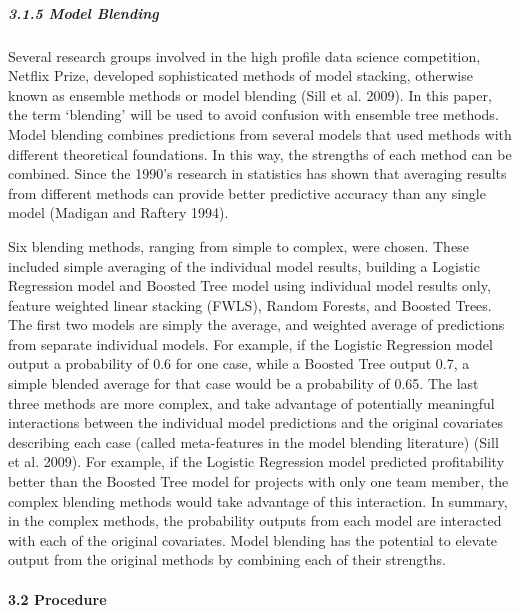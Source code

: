 \documentclass[]{elsarticle} %
\begin{document}
\subparagraph{3.1.5 Model Blending}\label{model-blending}

Several research groups involved in the high profile data science
competition, Netflix Prize, developed sophisticated methods of model
stacking, otherwise known as ensemble methods or model blending (Sill et
al. 2009). In this paper, the term `blending' will be used to avoid
confusion with ensemble tree methods. Model blending combines
predictions from several models that used methods with different
theoretical foundations. In this way, the strengths of each method can
be combined. Since the 1990's research in statistics has shown that
averaging results from different methods can provide better predictive
accuracy than any single model (Madigan and Raftery 1994).

Six blending methods, ranging from simple to complex, were chosen. These
included simple averaging of the individual model results, building a
Logistic Regression model and Boosted Tree model using individual model
results only, feature weighted linear stacking (FWLS), Random Forests,
and Boosted Trees. The first two models are simply the average, and
weighted average of predictions from separate individual models. For
example, if the Logistic Regression model output a probability of 0.6
for one case, while a Boosted Tree output 0.7, a simple blended average
for that case would be a probability of 0.65. The last three methods are
more complex, and take advantage of potentially meaningful interactions
between the individual model predictions and the original covariates
describing each case (called meta-features in the model blending
literature) (Sill et al. 2009). For example, if the Logistic Regression
model predicted profitability better than the Boosted Tree model for
projects with only one team member, the complex blending methods would
take advantage of this interaction. In summary, in the complex methods,
the probability outputs from each model are interacted with each of the
original covariates. Model blending has the potential to elevate output
from the original methods by combining each of their strengths.

\paragraph{3.2 Procedure}\label{procedure}
\end{document}
